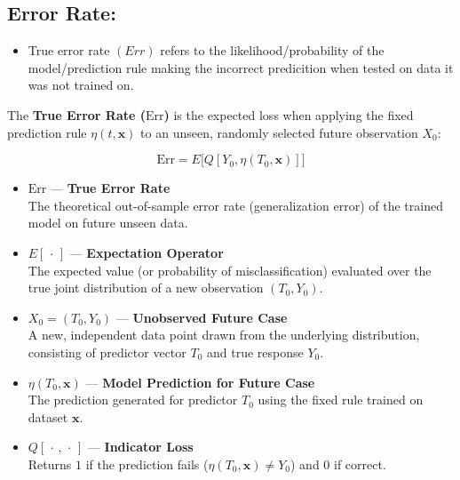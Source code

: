 \documentclass[
  letterpaper,
  DIV=11,
  numbers=noendperiod]{scrreprt}
\providecommand{\tightlist}{%
  \setlength{\itemsep}{0pt}\setlength{\parskip}{0pt}}
\begin{document}
\subsection{Error Rate:}\label{error-rate}

\begin{itemize}
\tightlist
\item
  True error rate \((Err)\) refers to the likelihood/probability of the
  model/prediction rule making the incorrect predicition when tested on
  data it was not trained on.
\end{itemize}

\begin{tcolorbox}[enhanced jigsaw, arc=.35mm, bottomrule=.15mm, bottomtitle=1mm, breakable, colback=white, colbacktitle=quarto-callout-note-color!10!white, colframe=quarto-callout-note-color-frame, coltitle=black, left=2mm, leftrule=.75mm, opacityback=0, opacitybacktitle=0.6, rightrule=.15mm, title=\textcolor{quarto-callout-note-color}{\faInfo}\hspace{0.5em}{Definition: True Error Rate}, titlerule=0mm, toprule=.15mm, toptitle=1mm]

The \textbf{True Error Rate (\(\text{Err}\))} is the expected loss when
applying the fixed prediction rule \(\eta(t, \mathbf{x})\) to an unseen,
randomly selected future observation \(X_0\):

\[
\text{Err} = E\Big[Q[Y_0, \eta(T_0, \mathbf{x})]\Big]
\]

\begin{itemize}
\item
  \textbf{\(\text{Err}\)} --- \textbf{True Error Rate}\\
  The theoretical out-of-sample error rate (generalization error) of the
  trained model on future unseen data.
\item
  \textbf{\(E[\,\cdot\,]\)} --- \textbf{Expectation Operator}\\
  The expected value (or probability of misclassification) evaluated
  over the true joint distribution of a new observation \((T_0, Y_0)\).
\item
  \textbf{\(X_0 = (T_0, Y_0)\)} --- \textbf{Unobserved Future Case}\\
  A new, independent data point drawn from the underlying distribution,
  consisting of predictor vector \(T_0\) and true response \(Y_0\).
\item
  \textbf{\(\eta(T_0, \mathbf{x})\)} --- \textbf{Model Prediction for
  Future Case}\\
  The prediction generated for predictor \(T_0\) using the fixed rule
  trained on dataset \(\mathbf{x}\).
\item
  \textbf{\(Q[\,\cdot\,,\,\cdot\,]\)} --- \textbf{Indicator Loss}\\
  Returns \(1\) if the prediction fails
  (\(\eta(T_0, \mathbf{x}) \neq Y_0\)) and \(0\) if correct.
\end{itemize}

\end{tcolorbox}
\end{document}

